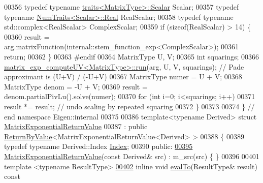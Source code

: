 \begin{DoxyCode}
00356   \textcolor{keyword}{typedef} \textcolor{keyword}{typename} \hyperlink{struct_eigen_1_1internal_1_1traits}{traits<MatrixType>::Scalar} Scalar;
00357   \textcolor{keyword}{typedef} \textcolor{keyword}{typename} \hyperlink{group___core___module_struct_eigen_1_1_num_traits}{NumTraits<Scalar>::Real} RealScalar;
00358   \textcolor{keyword}{typedef} \textcolor{keyword}{typename} std::complex<RealScalar> ComplexScalar;
00359   \textcolor{keywordflow}{if} (\textcolor{keyword}{sizeof}(RealScalar) > 14) \{
00360     result = arg.matrixFunction(internal::stem\_function\_exp<ComplexScalar>);
00361     \textcolor{keywordflow}{return};
00362   \}
00363 \textcolor{preprocessor}{#endif}
00364   MatrixType U, V;
00365   \textcolor{keywordtype}{int} squarings; 
00366   \hyperlink{struct_eigen_1_1internal_1_1matrix__exp__compute_u_v_a7847531ae0fccc8ec7648f95846c8adb}{matrix\_exp\_computeUV<MatrixType>::run}(arg, U, V, squarings); \textcolor{comment}{// Pade
       approximant is (U+V) / (-U+V)}
00367   MatrixType numer = U + V;
00368   MatrixType denom = -U + V;
00369   result = denom.partialPivLu().solve(numer);
00370   \textcolor{keywordflow}{for} (\textcolor{keywordtype}{int} i=0; i<squarings; i++)
00371     result *= result;   \textcolor{comment}{// undo scaling by repeated squaring}
00372 \}
00373 
00374 \} \textcolor{comment}{// end namespace Eigen::internal}
00375 
00386 \textcolor{keyword}{template}<\textcolor{keyword}{typename} Derived> \textcolor{keyword}{struct }\hyperlink{struct_eigen_1_1_matrix_exponential_return_value}{MatrixExponentialReturnValue}
00387 : \textcolor{keyword}{public} \hyperlink{group___core___module_class_eigen_1_1_return_by_value}{ReturnByValue}<MatrixExponentialReturnValue<Derived> >
00388 \{
00389     \textcolor{keyword}{typedef} \textcolor{keyword}{typename} Derived::Index \hyperlink{namespace_eigen_a62e77e0933482dafde8fe197d9a2cfde}{Index};
00390   \textcolor{keyword}{public}:
\hyperlink{struct_eigen_1_1_matrix_exponential_return_value_a4048419b1ee2befc51564703ba11acab}{00395}     \hyperlink{struct_eigen_1_1_matrix_exponential_return_value_a4048419b1ee2befc51564703ba11acab}{MatrixExponentialReturnValue}(\textcolor{keyword}{const} Derived& src) : m\_src(src) \{ \}
00396 
00401     \textcolor{keyword}{template} <\textcolor{keyword}{typename} ResultType>
\hyperlink{struct_eigen_1_1_matrix_exponential_return_value_a3dd2c65c7c6cdc41ab17415ee11899a0}{00402}     \textcolor{keyword}{inline} \textcolor{keywordtype}{void} \hyperlink{struct_eigen_1_1_matrix_exponential_return_value_a3dd2c65c7c6cdc41ab17415ee11899a0}{evalTo}(ResultType& result)\textcolor{keyword}{ const}

\end{DoxyCode}
